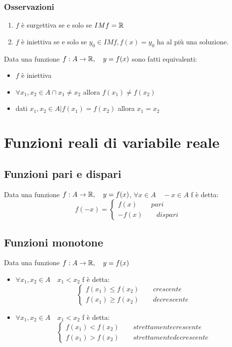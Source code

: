 \subsubsection{Osservazioni}
\begin{enumerate}
	\item $f$ è surgettiva se e solo se $IM f=\mathbb{R}$
	\item $f$ è iniettiva se e solo se $y_0 \in IM f, f(x)=y_0$ ha al più una soluzione.
\end{enumerate}

Data una funzione $f: A \rightarrow \mathbb{R} , \quad y=f(x)$ sono fatti equivalenti:
\begin{itemize}
	\item $f$ è iniettiva
	\item $\forall x_1, x_2 \in A \cap x_1 \neq x_2$ allora $f(x_1)\neq f(x_2)$
	\item dati $x_1,x_2 \in A | f(x_1)=f(x_2)$ allora $x_1=x_2$
\end{itemize}


\section{Funzioni reali di variabile reale}
\subsection{Funzioni pari e dispari}
Data una funzione $f: A \rightarrow \mathbb{R} , \quad y=f(x)$, $\forall x\in A \quad -x\in A$ f è detta:
\[f(-x)= \begin{cases}
	f(x) \qquad pari\\
	-f(x) \qquad dispari
\end{cases}
\]

\subsection{Funzioni monotone}
Data una funzione $f: A \rightarrow \mathbb{R} , \quad y=f(x)$
\begin{itemize}
	\item $\forall x_1, x_2 \in A \quad x_1<x_2$ f è detta:
	\[\begin{cases}
		f(x_1) \leq f(x_2) \qquad crescente\\
		f(x_1) \geq f(x_2) \qquad decrescente
	\end{cases}
	\]
	\item $\forall x_1, x_2 \in A \quad x_1<x_2$ f è detta:
	\[\begin{cases}
		f(x_1) < f(x_2) \qquad strettamente crescente\\
		f(x_1) > f(x_2) \qquad strettamente decrescente
	\end{cases}
	\]
\end{itemize}


